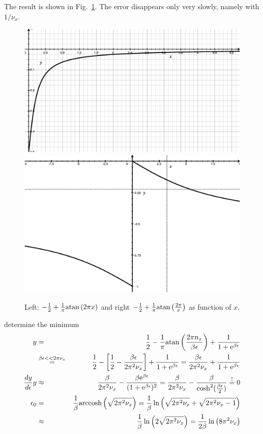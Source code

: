 \documentclass[11pt,a4paper]{report}
\begin{document}
The result is shown in Fig.~\ref{fig:matsubaracorr}. 
The error disappears only very slowly, namely with $1/\nu_x$.
\begin{figure}[!hb]
\begin{center}
\includegraphics[width=0.4\linewidth]{Figs/matsubaracorr.eps}
\includegraphics[width=0.4\linewidth]{Figs/matsubaracorrofe.eps}
\end{center}
\caption{\label{fig:matsubaracorr}
Left: $-\frac{1}{2}
+\frac{1}{\pi}{\rm atan}\left(2\pi x\right)$ 
and right $-\frac{1}{2}
+\frac{1}{\pi}{\rm atan}\left(\frac{2\pi}{x}\right)$ 
as function of $x$.
}
\end{figure}


determine the minimum
\begin{eqnarray}
y&=&
\frac{1}{2}-\frac{1}{\pi}{\rm atan}\left(\frac{2\pi n_x}{\beta\epsilon}\right)
+\frac{1}{1+\mathrm{e}^{\beta\epsilon}}
\nonumber\\
&\stackrel{\beta\epsilon<<2\pi\nu_x}{=}&
\frac{1}{2}-\left[\frac{1}{2}-\frac{\beta\epsilon}{2\pi^2\nu_x}\right]
+\frac{1}{1+\mathrm{e}^{\beta\epsilon}}
=
\frac{\beta\epsilon}{2\pi^2\nu_x}+\frac{1}{1+\mathrm{e}^{\beta\epsilon}}
\nonumber\\
\frac{dy}{d\epsilon}y&\approx&
\frac{\beta}{2\pi^2\nu_x}-\frac{\beta\mathrm{e}^{\beta\epsilon}}{(1+\mathrm{e}^{\beta\epsilon})^2}
=\frac{\beta}{2\pi^2\nu_x}-\frac{\beta}{\cosh^2(\frac{\beta\epsilon}{2})}
\stackrel{!}{=}0
\nonumber\\
\epsilon_0&=&
\frac{1}{\beta}\textrm{arccosh}\left(\sqrt{2\pi^2\nu_x}\right)
=\frac{1}{\beta}\ln\left(
\sqrt{2\pi^2\nu_x}+\sqrt{2\pi^2\nu_x-1}\right)
\nonumber\\
&\approx&
\frac{1}{\beta}\ln\left(2\sqrt{2\pi^2\nu_x}\right)
=\frac{1}{2\beta}\ln\left(8\pi^2\nu_x\right)
\end{eqnarray}
\end{document}
